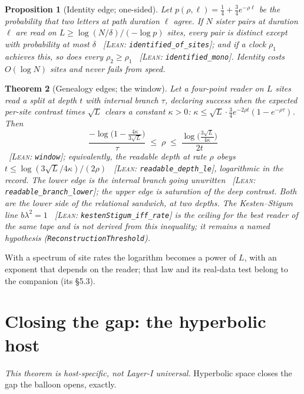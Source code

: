 \documentclass[11pt,reqno]{amsart}
\theoremstyle{plain}
\newtheorem{theorem}{Theorem}[section]
\newtheorem{proposition}[theorem]{Proposition}
\theoremstyle{definition}
\newcommand{\cert}[1]{{\footnotesize\ [\textsc{Lean}: \texttt{#1}]}}
\begin{document}
\begin{proposition}[Identity edge; one-sided]\label{prop:identity}
Let $p(\rho,\ell)=\tfrac14+\tfrac34e^{-\rho\ell}$ be the probability that two letters at path duration $\ell$ agree. If $N$ sister pairs at duration $\ell$ are read on $L\ge\log(N/\delta)/(-\log p)$ sites, every pair is distinct except with probability at most $\delta$ \cert{identified\_of\_sites}; and if a clock $\rho_1$ achieves this, so does every $\rho_2\ge\rho_1$ \cert{identified\_mono}. Identity costs $O(\log N)$ sites and never fails from speed.
\end{proposition}

\begin{theorem}[Genealogy edges; the window]\label{thm:window}
Let a four-point reader on $L$ sites read a split at depth $t$ with internal branch $\tau$, declaring success when the expected per-site contrast times $\sqrt L$ clears a constant $\kappa>0$: $\kappa\le\sqrt L\cdot\tfrac34e^{-2\rho t}(1-e^{-\rho\tau})$. Then
\[
\frac{-\log\bigl(1-\tfrac{4\kappa}{3\sqrt L}\bigr)}{\tau}\;\le\;\rho\;\le\;\frac{\log\bigl(\tfrac{3\sqrt L}{4\kappa}\bigr)}{2t}
\]
\cert{window}; equivalently, the readable depth at rate $\rho$ obeys $t\le\log(3\sqrt L/4\kappa)/(2\rho)$ \cert{readable\_depth\_le}, logarithmic in the record. The lower edge is the internal branch going unwritten \cert{readable\_branch\_lower}; the upper edge is saturation of the deep contrast. Both are the lower side of the relational sandwich, at two depths. The Kesten--Stigum line $b\lambda^2=1$ \cert{kestenStigum\_iff\_rate} is the ceiling for the \emph{best} reader of the same tape and is not derived from this inequality; it remains a named hypothesis (\texttt{ReconstructionThreshold}).
\end{theorem}

With a spectrum of site rates the logarithm becomes a power of $L$, with an exponent that depends on the reader; that law and its real-data test belong to the companion (its \S5.3).

\section{Closing the gap: the hyperbolic host}\label{sec:relational}

\emph{This theorem is host-specific, not Layer-I universal.} Hyperbolic space closes the gap the balloon opens, exactly.
\end{document}
